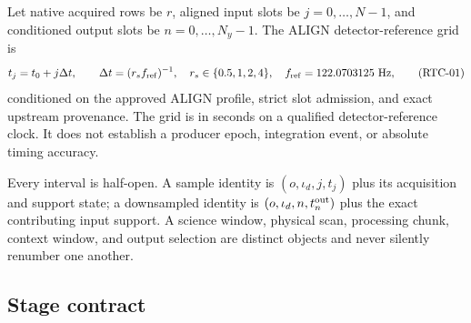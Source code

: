 \documentclass[11pt]{article}
\begin{document}
Let native acquired rows be $r$, aligned input slots be
$j=0,\ldots,N-1$, and conditioned output slots be
$n=0,\ldots,N_y-1$.  The ALIGN detector-reference grid is
\begin{equation}
 t_j=t_0+j\Delta t,\qquad
 \Delta t=(r_s f_{\rm ref})^{-1},\quad
 r_s\in\{0.5,1,2,4\},\quad f_{\rm ref}=122.0703125\ {\rm Hz},
 \tag{RTC-01}\label{eq:grid}
\end{equation}
conditioned on the approved ALIGN profile, strict slot admission, and exact
upstream provenance.  The grid is in seconds on a qualified detector-reference
clock.  It does not establish a producer epoch, integration event, or absolute
timing accuracy.

Every interval is half-open.  A sample identity is $(o,\iota_d,j,t_j)$ plus
its acquisition and support state; a downsampled identity is
$(o,\iota_d,n,t^{\rm out}_n)$ plus the exact contributing input support.  A
science window, physical scan, processing chunk, context window, and output
selection are distinct objects and never silently renumber one another.

\subsection{Stage contract}
\end{document}
